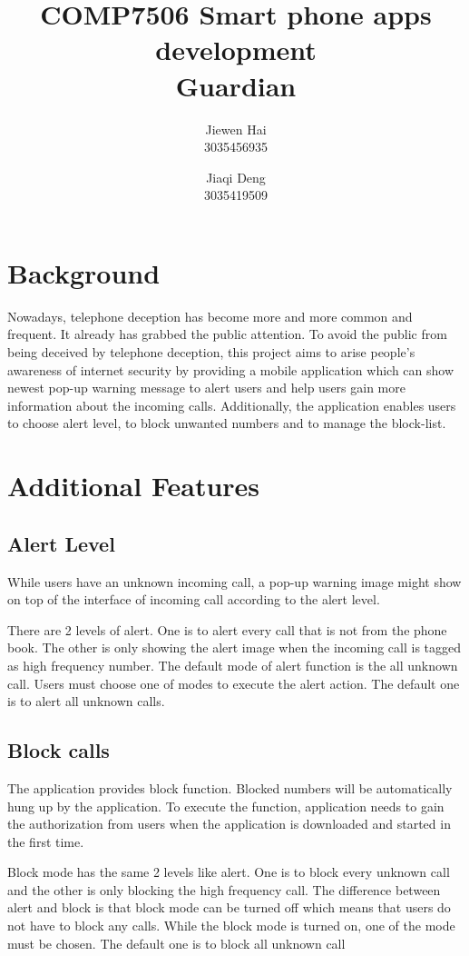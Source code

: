 \documentclass{article}
\author{
Jiewen Hai\\
3035456935
\and
Jiaqi Deng\\
3035419509
}
\title{COMP7506 Smart phone apps development\\Guardian}
\date{}
\begin{document}
    \maketitle

    \setcounter{tocdepth}{2}
    \tableofcontents

    \section{Background}
    Nowadays, telephone deception has become more and more common and frequent.
    It already has grabbed the public attention.
    To avoid the public from being deceived by telephone deception, this project aims to arise people’s awareness of internet security by providing a mobile application which can show newest pop-up warning message to alert users and help users gain more information about the incoming calls.
    Additionally, the application enables users to choose alert level, to block unwanted numbers and to manage the block-list.

    \section{Additional Features}
    \subsection{Alert Level}
    While users have an unknown incoming call, a pop-up warning image might show on top of the interface of incoming call according to the alert level.

    There are 2 levels of alert.
    One is to alert every call that is not from the phone book.
    The other is only showing the alert image when the incoming call is tagged as high frequency number.
    The default mode of alert function is the all unknown call.
    Users must choose one of modes to execute the alert action.
    The default one is to alert all unknown calls.

    \subsection{Block calls}
    The application provides block function.
    Blocked numbers will be automatically hung up by the application.
    To execute the function, application needs to gain the authorization from users when the application is downloaded and started in the first time.

    Block mode has the same 2 levels like alert.
    One is to block every unknown call and the other is only blocking the high frequency call.
    The difference between alert and block is that block mode can be turned off which means that users do not have to block any calls.
    While the block mode is turned on, one of the mode must be chosen. The default one is to block all unknown call
\end{document}
